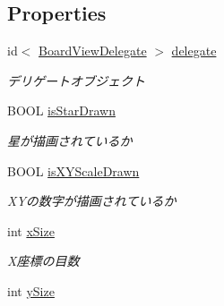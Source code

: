 \subsection*{Properties}
\begin{DoxyCompactItemize}
\item 
\hypertarget{interface_board_view_a711b8a7299dda4e88cc8024da31ab976}{
id$<$ \hyperlink{protocol_board_view_delegate-p}{BoardViewDelegate} $>$ \hyperlink{interface_board_view_a711b8a7299dda4e88cc8024da31ab976}{delegate}}
\label{interface_board_view_a711b8a7299dda4e88cc8024da31ab976}

\begin{DoxyCompactList}\small\item\em デリゲートオブジェクト \end{DoxyCompactList}\item 
\hypertarget{interface_board_view_a5ad1876cb123df583595fc3c2ef2bd59}{
BOOL \hyperlink{interface_board_view_a5ad1876cb123df583595fc3c2ef2bd59}{isStarDrawn}}
\label{interface_board_view_a5ad1876cb123df583595fc3c2ef2bd59}

\begin{DoxyCompactList}\small\item\em 星が描画されているか \end{DoxyCompactList}\item 
\hypertarget{interface_board_view_ab64409d176ead5675462296b0d9b3481}{
BOOL \hyperlink{interface_board_view_ab64409d176ead5675462296b0d9b3481}{isXYScaleDrawn}}
\label{interface_board_view_ab64409d176ead5675462296b0d9b3481}

\begin{DoxyCompactList}\small\item\em XYの数字が描画されているか \end{DoxyCompactList}\item 
\hypertarget{interface_board_view_ae7e836788d82a05b05a3f8d90ce360b2}{
int \hyperlink{interface_board_view_ae7e836788d82a05b05a3f8d90ce360b2}{xSize}}
\label{interface_board_view_ae7e836788d82a05b05a3f8d90ce360b2}

\begin{DoxyCompactList}\small\item\em X座標の目数 \end{DoxyCompactList}\item 
\hypertarget{interface_board_view_ac83f921533e57a4df21a7a7fb671bfe9}{
int \hyperlink{interface_board_view_ac83f921533e57a4df21a7a7fb671bfe9}{ySize}}
\label{interface_board_view_ac83f921533e57a4df21a7a7fb671bfe9}


\end{DoxyCompactItemize}
